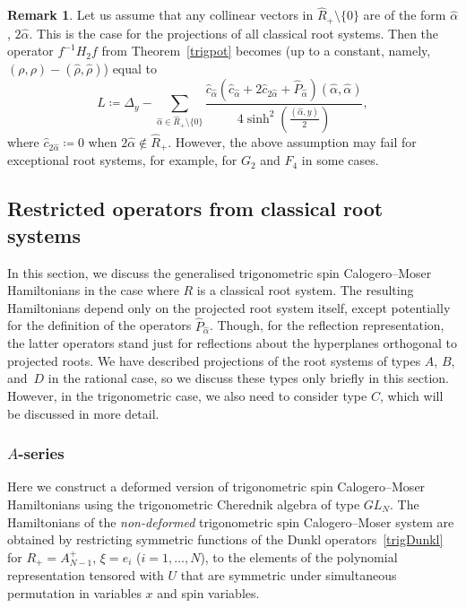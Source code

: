 \documentclass[12pt]{amsart}
\numberwithin{equation}{section}
\theoremstyle{definition}
\newtheorem{remark}[theorem]{Remark}
\begin{document}
\begin{remark}
Let us assume that any collinear vectors in $\widehat{R}_+ \setminus \{0\}$ are of the form $\widehat{\alpha}$, $2 \widehat{\alpha}$. This is the case for the projections of all classical root systems. Then the operator $f^{-1}H_2 f$ from Theorem~\ref{trigpot} becomes (up to a constant, namely, $(\rho, \rho) - (\widehat{\rho}, \widehat{\rho})$) equal to
\begin{equation}
\label{simpleform}
    L \coloneqq \Delta_y - \sum\limits_{\widehat{\alpha} \in \widehat{R}_+ \setminus \{0\}}
    \frac{\widehat{c}_{\widehat{\alpha}} (\widehat{c}_{\widehat{\alpha}} + 2 \widehat{c}_{2\widehat{\alpha}} + \widehat{P}_{\widehat{\alpha}})(\widehat{\alpha},\widehat{\alpha})}{4 \sinh^2 \left(\frac{(\widehat{\alpha},y)}{2}\right)},
\end{equation}
where $\widehat{c}_{2\widehat{\alpha}} \coloneqq 0$ when $2\widehat{\alpha} \notin \widehat{R}_+$.
However, the above assumption may fail for exceptional root systems, for example, for $G_2$ and $F_4$ in some cases. 
\end{remark}



\subsection{Restricted operators from classical root systems}
In this section, we discuss the generalised trigonometric spin Calogero--Moser Hamiltonians in the case where $R$ is a classical root system. 
The resulting Hamiltonians depend only on the projected root system itself, except potentially for the definition of the operators $\widehat{P}_{\widehat{\alpha}}$. Though, for the reflection representation, the latter operators stand just for reflections about the hyperplanes orthogonal to projected roots. 
We have described projections of the root systems of types $A$, $B$, and~$D$ in the rational case, so we discuss these types only briefly in this section. However, in the trigonometric case, we also need to consider type $C$, which will be discussed in more detail.


\subsubsection{$A$-series}\label{trig type A}
Here we construct a deformed version of trigonometric spin Calogero--Moser Hamiltonians using the trigonometric Cherednik
algebra of type $GL_N$. The Hamiltonians of the \emph{non-deformed} trigonometric spin Calogero--Moser system are obtained by restricting symmetric functions of the Dunkl operators~\eqref{trigDunkl} for $R_+ = A_{N-1}^+$, $\xi = e_i$ ($i=1, \dots, N$), to the elements of the polynomial representation tensored with $U$ that are symmetric under simultaneous permutation in variables $x$ and spin variables.
\end{document}
